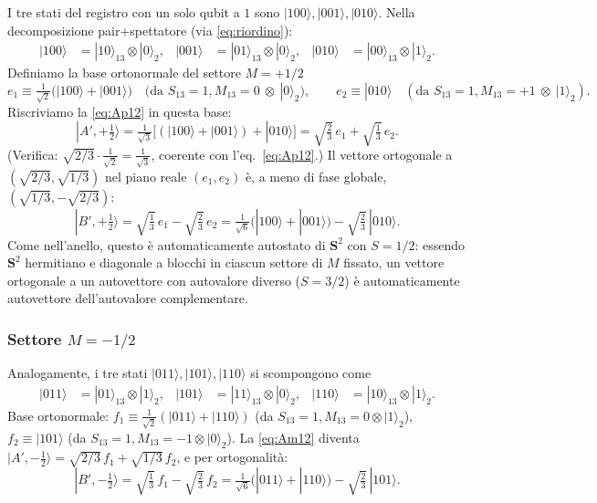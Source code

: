 \documentclass[11pt,a4paper]{article}
\begin{document}
I tre stati del registro con un solo qubit a $1$ sono $|100\rangle,|001\rangle,|010\rangle$.
Nella decomposizione pair+spettatore (via \eqref{eq:riordino}):
\begin{align}
|100\rangle &= |10\rangle_{13}\otimes|0\rangle_2, &
|001\rangle &= |01\rangle_{13}\otimes|0\rangle_2, &
|010\rangle &= |00\rangle_{13}\otimes|1\rangle_2 .
\end{align}
Definiamo la base ortonormale del settore $M{=}{+}1/2$
\begin{equation}
e_1 \equiv \tfrac1{\sqrt2}\big(|100\rangle+|001\rangle\big) \quad(\text{da }S_{13}{=}1,M_{13}{=}0\ \otimes\ |0\rangle_2),
\qquad
e_2 \equiv |010\rangle \quad(\text{da }S_{13}{=}1,M_{13}{=}{+}1\ \otimes\ |1\rangle_2).
\end{equation}
Riscriviamo la \eqref{eq:Ap12} in questa base:
\begin{equation}
|A',{+}\tfrac12\rangle = \tfrac1{\sqrt3}\big[(|100\rangle+|001\rangle)+|010\rangle\big]
= \sqrt{\tfrac23}\,e_1 + \sqrt{\tfrac13}\,e_2 .
\end{equation}
(Verifica: $\sqrt{2/3}\cdot\tfrac1{\sqrt2}=\tfrac1{\sqrt3}$, coerente con
l'eq.~\eqref{eq:Ap12}.) Il vettore ortogonale a $(\sqrt{2/3},\sqrt{1/3})$ nel
piano reale $(e_1,e_2)$ è, a meno di fase globale, $(\sqrt{1/3},-\sqrt{2/3})$:
\begin{equation}
|B',{+}\tfrac12\rangle = \sqrt{\tfrac13}\,e_1 - \sqrt{\tfrac23}\,e_2
= \tfrac1{\sqrt6}\big(|100\rangle+|001\rangle\big) - \sqrt{\tfrac23}\,|010\rangle .
\label{eq:Bp12}
\end{equation}
Come nell'anello, questo è automaticamente autostato di $\mathbf S^2$ con
$S=1/2$: essendo $\mathbf S^2$ hermitiano e diagonale a blocchi in ciascun
settore di $M$ fissato, un vettore ortogonale a un autovettore con
autovalore diverso ($S=3/2$) è automaticamente autovettore dell'autovalore
complementare.

\subsubsection{Settore $M={-}1/2$}

Analogamente, i tre stati $|011\rangle,|101\rangle,|110\rangle$ si scompongono come
\begin{align}
|011\rangle &= |01\rangle_{13}\otimes|1\rangle_2, &
|101\rangle &= |11\rangle_{13}\otimes|0\rangle_2, &
|110\rangle &= |10\rangle_{13}\otimes|1\rangle_2 .
\end{align}
Base ortonormale: $f_1\equiv\tfrac1{\sqrt2}(|011\rangle+|110\rangle)$ (da
$S_{13}{=}1,M_{13}{=}0\otimes|1\rangle_2$), $f_2\equiv|101\rangle$ (da
$S_{13}{=}1,M_{13}{=}{-}1\otimes|0\rangle_2$). La \eqref{eq:Am12} diventa
$|A',{-}\tfrac12\rangle=\sqrt{2/3}\,f_1+\sqrt{1/3}\,f_2$, e per ortogonalità:
\begin{equation}
|B',{-}\tfrac12\rangle = \sqrt{\tfrac13}\,f_1-\sqrt{\tfrac23}\,f_2
= \tfrac1{\sqrt6}\big(|011\rangle+|110\rangle\big) - \sqrt{\tfrac23}\,|101\rangle .
\label{eq:Bm12}
\end{equation}
\end{document}
